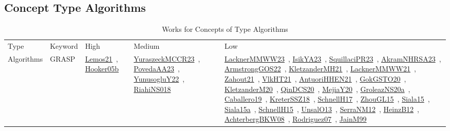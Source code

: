 \clearpage
\subsection{Concept Type Algorithms}
\label{sec:Algorithms}
{\scriptsize
\begin{longtable}{lp{3cm}>{\raggedright\arraybackslash}p{6cm}>{\raggedright\arraybackslash}p{6cm}>{\raggedright\arraybackslash}p{8cm}}
\rowcolor{white}\caption{Works for Concepts of Type Algorithms}\\ \toprule
\rowcolor{white}Type & Keyword & High & Medium & Low\\ \midrule\endhead
\bottomrule
\endfoot
Algorithms & GRASP & \href{../works/Lemos21.pdf}{Lemos21}~\cite{Lemos21}, \href{../works/Hooker05b.pdf}{Hooker05b}~\cite{Hooker05b} & \href{../works/YuraszeckMCCR23.pdf}{YuraszeckMCCR23}~\cite{YuraszeckMCCR23}, \href{../works/PovedaAA23.pdf}{PovedaAA23}~\cite{PovedaAA23}, \href{../works/YunusogluY22.pdf}{YunusogluY22}~\cite{YunusogluY22}, \href{../works/RiahiNS018.pdf}{RiahiNS018}~\cite{RiahiNS018} & \href{../works/LacknerMMWW23.pdf}{LacknerMMWW23}~\cite{LacknerMMWW23}, \href{../works/IsikYA23.pdf}{IsikYA23}~\cite{IsikYA23}, \href{../works/SquillaciPR23.pdf}{SquillaciPR23}~\cite{SquillaciPR23}, \href{../works/AkramNHRSA23.pdf}{AkramNHRSA23}~\cite{AkramNHRSA23}, \href{../works/ArmstrongGOS22.pdf}{ArmstrongGOS22}~\cite{ArmstrongGOS22}, \href{../works/KletzanderMH21.pdf}{KletzanderMH21}~\cite{KletzanderMH21}, \href{../works/LacknerMMWW21.pdf}{LacknerMMWW21}~\cite{LacknerMMWW21}, \href{../works/Zahout21.pdf}{Zahout21}~\cite{Zahout21}, \href{../works/VlkHT21.pdf}{VlkHT21}~\cite{VlkHT21}, \href{../works/AntuoriHHEN21.pdf}{AntuoriHHEN21}~\cite{AntuoriHHEN21}, \href{../works/GokGSTO20.pdf}{GokGSTO20}~\cite{GokGSTO20}, \href{../works/KletzanderM20.pdf}{KletzanderM20}~\cite{KletzanderM20}, \href{../works/QinDCS20.pdf}{QinDCS20}~\cite{QinDCS20}, \href{../works/MejiaY20.pdf}{MejiaY20}~\cite{MejiaY20}, \href{../works/GroleazNS20a.pdf}{GroleazNS20a}~\cite{GroleazNS20a}, \href{../works/Caballero19.pdf}{Caballero19}~\cite{Caballero19}, \href{../works/KreterSSZ18.pdf}{KreterSSZ18}~\cite{KreterSSZ18}, \href{../works/SchnellH17.pdf}{SchnellH17}~\cite{SchnellH17}, \href{../works/ZhouGL15.pdf}{ZhouGL15}~\cite{ZhouGL15}, \href{../works/Siala15.pdf}{Siala15}~\cite{Siala15}, \href{../works/Siala15a.pdf}{Siala15a}~\cite{Siala15a}, \href{../works/SchnellH15.pdf}{SchnellH15}~\cite{SchnellH15}, \href{../works/UnsalO13.pdf}{UnsalO13}~\cite{UnsalO13}, \href{../works/SerraNM12.pdf}{SerraNM12}~\cite{SerraNM12}, \href{../works/HeinzB12.pdf}{HeinzB12}~\cite{HeinzB12}, \href{../works/AchterbergBKW08.pdf}{AchterbergBKW08}~\cite{AchterbergBKW08}, \href{../works/Rodriguez07.pdf}{Rodriguez07}~\cite{Rodriguez07}, \href{../works/JainM99.pdf}{JainM99}~\cite{JainM99}\\

\end{longtable}}

